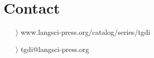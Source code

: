 \documentclass[
notumble,
nofoldmark,
]{leaflet}
\begin{document}
{{    \section{\color{LIGHTGRAY} \sffamily \Large Contact} 
	\begin{itemize}
	  \item[$\rangle$] \sffamily www.langsci-press.org/catalog/series/tgdi
	  \item[$\rangle$]\sffamily  tgdi@langsci-press.org 
	\end{itemize} 
  }
}

\usebox{\pageone}

\newpage

\usebox{\pagetwo}

\newpage

\usebox{\pagetwo}

\newpage

\usebox{\pagetwo}

\newpage

\usebox{\pageone}

\newpage

\usebox{\pageone}
 

\loggingall
\end{document}

